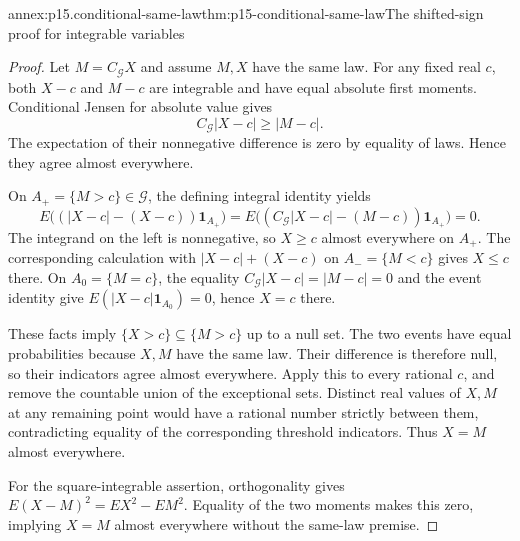 \begin{annexitem}{annex:p15.conditional-same-law}{thm:p15-conditional-same-law}{The shifted-sign proof for integrable variables}
\begin{proof}
Let \(M=C_{\mathcal G}X\) and assume \(M,X\) have the same law.
For any fixed real \(c\), both \(X-c\) and \(M-c\) are integrable
and have equal absolute first moments.
Conditional Jensen for absolute value gives
\[
                         C_{\mathcal G}|X-c|\geq|M-c|.
\]
The expectation of their nonnegative difference is zero by equality
of laws. Hence they agree almost everywhere.

On \(A_+=\{M>c\}\in\mathcal G\), the defining integral identity yields
\[
 E\bigl((|X-c|-(X-c))\mathbf1_{A_+}\bigr)
   =E\bigl((C_{\mathcal G}|X-c|-(M-c))\mathbf1_{A_+}\bigr)=0.
\]
The integrand on the left is nonnegative, so \(X\geq c\)
almost everywhere on \(A_+\).
The corresponding calculation with
\(|X-c|+(X-c)\) on \(A_-=\{M<c\}\) gives \(X\leq c\) there.
On \(A_0=\{M=c\}\), the equality
\(C_{\mathcal G}|X-c|=|M-c|=0\) and the event identity give
\(E(|X-c|\mathbf1_{A_0})=0\), hence \(X=c\) there.

These facts imply \(\{X>c\}\subseteq\{M>c\}\) up to a null set.
The two events have equal probabilities because \(X,M\) have the same law.
Their difference is therefore null, so their indicators agree
almost everywhere.
Apply this to every rational \(c\), and remove the countable union
of the exceptional sets. Distinct real values of \(X,M\) at any
remaining point would have a rational number strictly between them,
contradicting equality of the corresponding threshold indicators.
Thus \(X=M\) almost everywhere.

For the square-integrable assertion, orthogonality gives
\(E(X-M)^2=EX^2-EM^2\). Equality of the two moments makes this
zero, implying \(X=M\) almost everywhere without the same-law premise.
\end{proof}
\end{annexitem}

